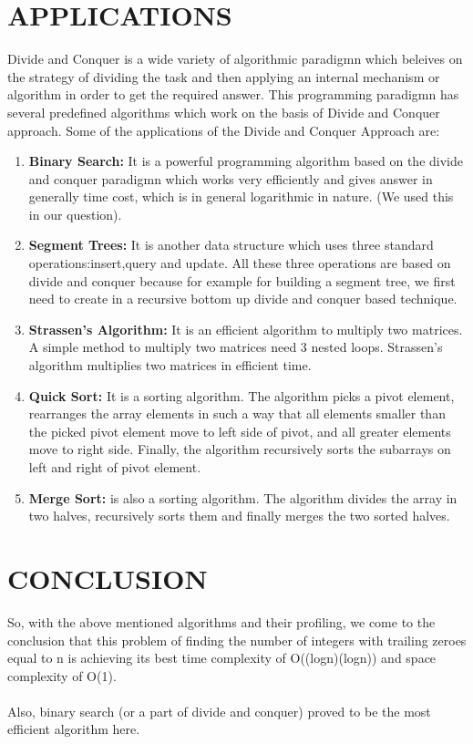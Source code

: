 \documentclass[10pt]{article}
\begin{document}
\begin{multicols*}{2}
\section*{APPLICATIONS}
Divide and Conquer is a wide variety of algorithmic paradigmn which beleives on the strategy of dividing the task and then applying an internal mechanism or algorithm in order to get the required answer. This programming paradigmn has several predefined algorithms which work on the basis of Divide and Conquer approach. Some of the applications of the Divide and Conquer Approach are:

\begin{enumerate}
\item \textbf{Binary Search:} It is a powerful programming algorithm based on the divide and conquer paradigmn which works very efficiently and gives answer in generally time cost, which is in general logarithmic in nature. (We used this in our question).
\item \textbf{Segment Trees:} It is another data structure which uses three standard operations:insert,query and update. All these three operations are based on divide and conquer because for example for building a segment tree, we first need to create in a recursive bottom up divide and conquer based technique.
\item  \textbf{Strassen’s Algorithm:} It is an efficient algorithm to multiply two matrices. A simple method to multiply two matrices need 3 nested loops. Strassen’s algorithm multiplies two matrices in efficient time.
\item \textbf{Quick Sort:} It is a sorting algorithm. The algorithm picks a pivot element, rearranges the array elements in such a way that all elements smaller than the picked pivot element move to left side of pivot, and all greater elements move to right side. Finally, the algorithm recursively sorts the subarrays on left and right of pivot element.
\item \textbf{Merge Sort:} is also a sorting algorithm. The algorithm divides the array in two halves, recursively sorts them and finally merges the two sorted halves.
\end{enumerate}
\section*{CONCLUSION}

So, with the above mentioned algorithms and their profiling, we come to the conclusion that this problem of finding the number of integers with trailing zeroes equal to n is achieving its best time complexity of O((logn)(logn)) and space complexity of O(1).\\\\ Also, binary search (or a part of divide and conquer) proved to be the most efficient algorithm here.


\end{multicols*}
\end{document}
